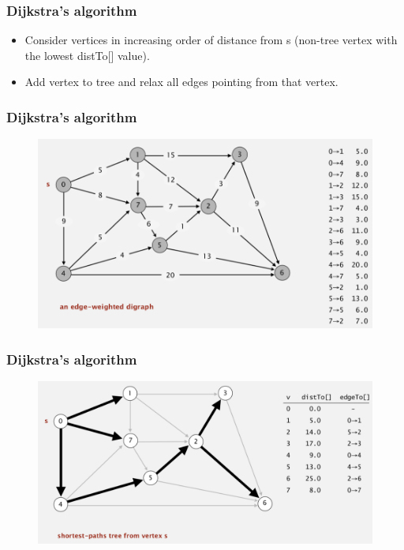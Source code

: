 \documentclass[11pt]{beamer}
\begin{document}
\begin{frame}
	\frametitle	{Dijkstra's algorithm} 
	\begin{itemize}
		\item Consider vertices in increasing order of distance from s (non-tree vertex with the lowest distTo[] value).
	   \item Add vertex to tree and relax all edges pointing from that vertex.
	\end{itemize}    
\end{frame}

\begin{frame}
	\frametitle	{Dijkstra's algorithm} 
    \begin{figure}
    	\centering
    	\includegraphics[width=1.05\linewidth]{"Screenshot 2020-12-06 at 8.03.33 PM"}
    	\label{fig:screenshot-2020-12-06-at-8}
    \end{figure}   
\end{frame}

\begin{frame}
	\frametitle	{Dijkstra's algorithm} 
   \begin{figure}
   	\centering
   	\includegraphics[width=1.05\linewidth]{"Screenshot 2020-12-06 at 8.05.57 PM"}
   	\label{fig:screenshot-2020-12-06-at-8}
   \end{figure}   
\end{frame}
\end{document}
